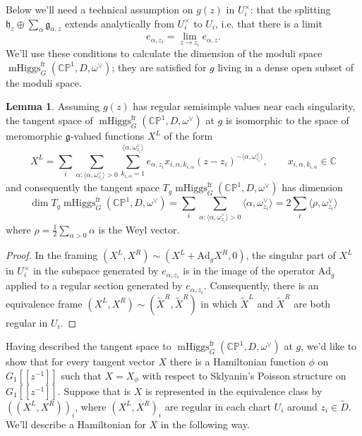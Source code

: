 \documentclass[11pt, oneside, reqno]{amsart}
\theoremstyle{definition} \newtheorem{definition}{Definition}[section]
\newtheorem{lemma}[definition]{Lemma}
\theoremstyle{definition} \newtheorem{remark}[definition]{Remark}
\theoremstyle{definition} \newtheorem{remarks}[definition]{Remarks}
\theoremstyle{definition} \newtheorem{question}[definition]{Question}
\theoremstyle{definition} \newtheorem*{note}{Note}
\theoremstyle{definition} \newtheorem{example}[definition]{Example}
\theoremstyle{definition} \newtheorem{examples}[definition]{Examples}
\renewcommand{\gg}{\mathfrak{g}}
\newcommand{\hh}{\mathfrak{h}}
\newcommand{\bb}[1]{\mathbb{#1}}
\newcommand{\mr}[1]{\mathrm{#1}}
\DeclareMathOperator{\mhiggs}{mHiggs}
\newcommand{\fr}{\mathrm{fr}}
\newcommand{\Ad}{\mr{Ad}}
\begin{document}
Below we'll need a technical assumption on $g(z)$ in $U_{i}^{\times}$: that the splitting
$\hh_{z} \oplus \sum_{\alpha} \gg_{\alpha,z}$ extends analytically from $U_{i}^{\times}$ to $U_{i}$,
i.e. that there is a limit 
 \[ e_{\alpha, z_i} = \lim_{z \to z_i} e_{\alpha, z}.\] 
We'll use these conditions to calculate the dimension of the moduli space $\mhiggs^\fr_G(\bb{CP}^1, D, \omega^\vee)$; they are satisfied for $g$ living in a dense open subset of the moduli space. 

\begin{lemma}
  Assuming $g(z)$ has regular semisimple values near each singularity, the tangent space of $\mhiggs^\fr_G(\bb{CP}^1, D, \omega^\vee)$ at $g$ is isomorphic to the space of meromorphic $\gg$-valued functions $X^{L}$ of the form
  \begin{equation}
\label{eq:XL}
    X^{L} = \sum_{i} \sum_{\alpha: \langle \alpha, \omega_{z_i}^{\vee} \rangle > 0 }
    \sum_{k_{i, \alpha} = 1}^{ \langle \alpha , \omega_{z_i}^{\vee} \rangle} e_{\alpha,{z_i}} x_{i, \alpha, k_{i, \alpha}} (z - z_i)^{-\langle \alpha, \omega_{z_i}^{\vee}\rangle }, \qquad x_{i, \alpha, k_{i, \alpha}} \in \mathbb{C}
  \end{equation}
  and consequently the tangent space $T_g \mhiggs^\fr_G(\bb{CP}^1, D, \omega^\vee)$ has dimension 
  \begin{equation}
\label{eq:dim-unreduced} 
\dim T_g \mhiggs^\fr_G(\bb{CP}^1, D, \omega^\vee) = \sum_{i} \sum_{\alpha: \langle \alpha, \omega_{z_i}^{\vee} \rangle > 0 } \langle \alpha, \omega_{z_i}^{\vee} \rangle = 2 \sum_{i} \langle \rho, \omega^{\vee}_{z_i}\rangle 
  \end{equation}
  where $\rho = \frac 1 2 \sum_{\alpha > 0} \alpha$ is the Weyl vector.
\end{lemma}

\begin{proof}
  In the framing $(X^{L}, X^{R}) \sim (X^{L} + \Ad_{g} X^{R}, 0 )$, the singular
  part of $X^{L}$ in $U_{i}^{\times}$ in the subspace generated by $e_{\alpha, z_i}$
  is in the image of the operator $\Ad_{g}$ applied to a regular section generated by $e_{\alpha, z_i}$.  Consequently, there is an equivalence frame $(X^{L}, X^{R}) \sim (\tilde X^{R}, \tilde X^{R})$  in which $\tilde X^{L}$ and $\tilde X^{R}$ are both regular in $U_{i}$. 
\end{proof}

Having described the tangent space to $\mhiggs^\fr_G(\bb{CP}^1, D, \omega^\vee)$ at $g$, we'd like to show that for every tangent vector $X$ there is a Hamiltonian function $\phi$ on $G_1[[z^{-1}]]$ such that $X = X_\phi$ with respect to Sklyanin's Poisson structure on $G_1[[z^{-1}]]$.  Suppose that is $X$ is represented in the equivalence class by $((X^{L}, X^{R}))_{i}$, where $(X^{L}, X^{R})_{i}$ are regular in each chart $U_i$ around $z_i \in \tilde D$.  We'll describe a Hamiltonian for $X$ in the following way.
\end{document}
